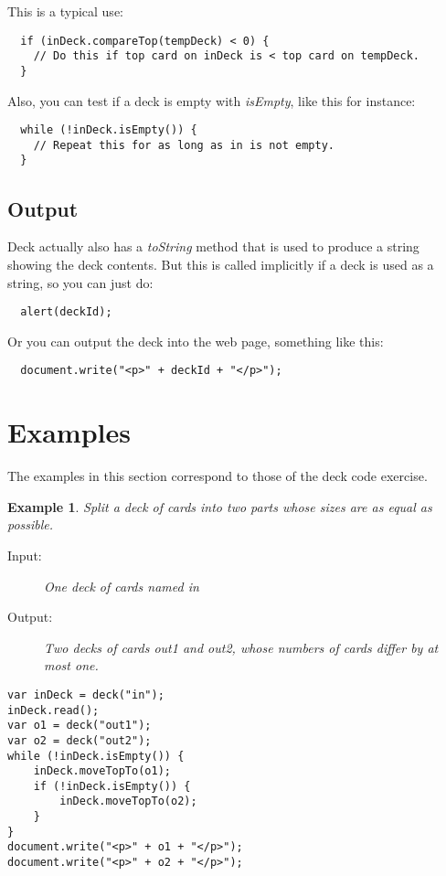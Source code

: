 \documentclass[a4paper,twoside]{tufte-handout}
\newtheorem{example}{Example}
\begin{document}
This is a typical use:
\begin{lstlisting}
  if (inDeck.compareTop(tempDeck) < 0) {
    // Do this if top card on inDeck is < top card on tempDeck.
  }
\end{lstlisting}

Also, you can test if a deck is empty with \emph{isEmpty}, like this
for instance:
\begin{lstlisting}
  while (!inDeck.isEmpty()) {
    // Repeat this for as long as in is not empty.
  }
\end{lstlisting}

\subsection{Output}\label{sec-output}

Deck actually also has a \emph{toString} method that is used to
produce a string showing the deck contents. But this is called
implicitly if a deck is used as a string, so you can just do:
\begin{lstlisting}
  alert(deckId);
\end{lstlisting}
Or you can output the deck into the web page, something like this:
\begin{lstlisting}
  document.write("<p>" + deckId + "</p>");
\end{lstlisting}

\clearpage

\section{Examples}\label{sec-examp}

The examples in this section correspond to those of the deck code exercise.

\begin{example}
  Split a deck of cards into two parts whose sizes are as equal as possible.
  \begin{description}
  \item[Input:] One deck of cards named \emph{in}
  \item[Output:] Two decks of cards \emph{out1} and \emph{out2},
    whose numbers of cards differ by at most one.
  \end{description}
\begin{lstlisting}
var inDeck = deck("in");
inDeck.read();
var o1 = deck("out1");
var o2 = deck("out2");
while (!inDeck.isEmpty()) {
    inDeck.moveTopTo(o1);
    if (!inDeck.isEmpty()) {
        inDeck.moveTopTo(o2);
    }
}
document.write("<p>" + o1 + "</p>");
document.write("<p>" + o2 + "</p>");
\end{lstlisting}
\end{example}
\end{document}
